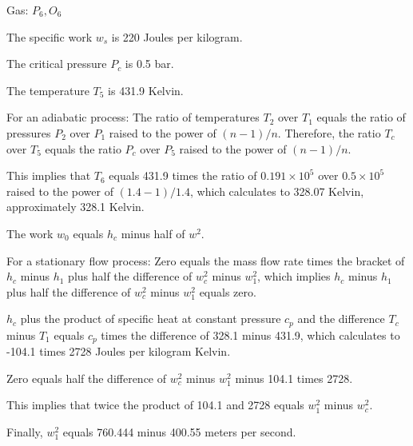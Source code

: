 Gas: \(P_6, O_6\)

The specific work \(w_s\) is 220 Joules per kilogram.

The critical pressure \(P_c\) is 0.5 bar.

The temperature \(T_5\) is 431.9 Kelvin.

For an adiabatic process:
The ratio of temperatures \(T_2\) over \(T_1\) equals the ratio of pressures \(P_2\) over \(P_1\) raised to the power of \((n-1)/n\). Therefore, the ratio \(T_c\) over \(T_5\) equals the ratio \(P_c\) over \(P_5\) raised to the power of \((n-1)/n\).

This implies that \(T_6\) equals 431.9 times the ratio of \(0.191 \times 10^5\) over \(0.5 \times 10^5\) raised to the power of \((1.4-1)/1.4\), which calculates to 328.07 Kelvin, approximately 328.1 Kelvin.

The work \(w_0\) equals \(h_c\) minus half of \(w^2\).

For a stationary flow process:
Zero equals the mass flow rate times the bracket of \(h_c\) minus \(h_1\) plus half the difference of \(w_c^2\) minus \(w_1^2\), which implies \(h_c\) minus \(h_1\) plus half the difference of \(w_c^2\) minus \(w_1^2\) equals zero.

\(h_c\) plus the product of specific heat at constant pressure \(c_p\) and the difference \(T_c\) minus \(T_1\) equals \(c_p\) times the difference of 328.1 minus 431.9, which calculates to -104.1 times 2728 Joules per kilogram Kelvin.

Zero equals half the difference of \(w_c^2\) minus \(w_1^2\) minus 104.1 times 2728.

This implies that twice the product of 104.1 and 2728 equals \(w_1^2\) minus \(w_c^2\).

Finally, \(w_1^2\) equals 760.444 minus 400.55 meters per second.